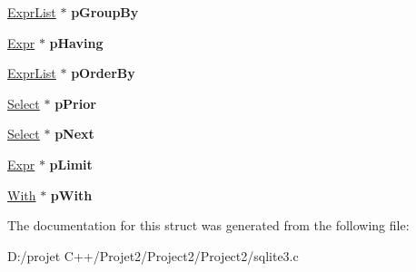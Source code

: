 \begin{DoxyCompactItemize}
\mbox{\hyperlink{struct_expr_list}{Expr\+List}} $\ast$ {\bfseries p\+Group\+By}
\item 
\mbox{\label{struct_select_ad09e0b115e6e1599e3075b87dfa6e66e}} 
\mbox{\hyperlink{struct_expr}{Expr}} $\ast$ {\bfseries p\+Having}
\item 
\mbox{\label{struct_select_a73c474cd4a9a9b9aa4e3187d8bf2d886}} 
\mbox{\hyperlink{struct_expr_list}{Expr\+List}} $\ast$ {\bfseries p\+Order\+By}
\item 
\mbox{\label{struct_select_a51d1a253b0aba5a54b11b3bf3896d056}} 
\mbox{\hyperlink{struct_select}{Select}} $\ast$ {\bfseries p\+Prior}
\item 
\mbox{\label{struct_select_a96aa0caf60390b8f5e88589639205c40}} 
\mbox{\hyperlink{struct_select}{Select}} $\ast$ {\bfseries p\+Next}
\item 
\mbox{\label{struct_select_a11d3b48d04d58be818cdefb10aa061a0}} 
\mbox{\hyperlink{struct_expr}{Expr}} $\ast$ {\bfseries p\+Limit}
\item 
\mbox{\label{struct_select_a3ab5597bdc6b219ea03a6aca93260e9f}} 
\mbox{\hyperlink{struct_with}{With}} $\ast$ {\bfseries p\+With}
\end{DoxyCompactItemize}


The documentation for this struct was generated from the following file\+:\begin{DoxyCompactItemize}
\item 
D\+:/projet C++/\+Projet2/\+Project2/\+Project2/sqlite3.\+c\end{DoxyCompactItemize}
